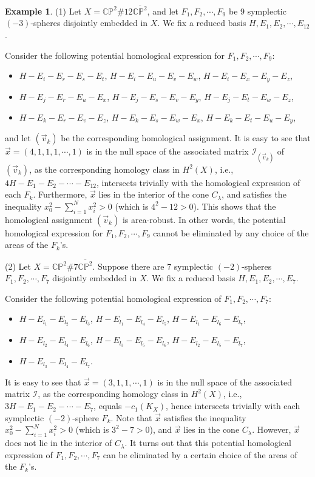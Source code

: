 \documentclass[11pt]{amsart}
\theoremstyle{plain}
\numberwithin{theorem}{section}
\theoremstyle{definition}
\newtheorem{example}[theorem]{Example}
\newcommand{\C}{{\mathbb C}}
\renewcommand{\P}{{\mathbb P}}
\newcommand{\I}{{\mathcal I}}
\begin{document}
\begin{example}
(1) Let $X=\C\P^2\# 12 \overline{\C\P^2}$, and let $F_1,F_2,\cdots,F_9$ be $9$ symplectic 
$(-3)$-spheres disjointly embedded in $X$. We fix a reduced basis $H,E_1,E_2,\cdots,E_{12}$.

Consider the following potential homological expression for $F_1,F_2,\cdots,F_9$:
\begin{itemize}
\item $H-E_{i}-E_{r}-E_{s}-E_t$, $H-E_{i}-E_u-E_v-E_w$, $H-E_{i}-E_x-E_y-E_z$,
\item $H-E_{j}-E_{r}-E_{u}-E_x$, $H-E_{j}-E_s-E_v-E_y$, $H-E_{j}-E_t-E_w-E_z$,
\item $H-E_{k}-E_{r}-E_{v}-E_z$, $H-E_{k}-E_s-E_w-E_x$, $H-E_{k}-E_t-E_u-E_y$,
\end{itemize}
and let $(\vec{v}_k)$ be the corresponding homological assignment. It is easy to see that 
$\vec{x}=(4,1,1,1,\cdots,1)$ is in the null space of the associated matrix $\I_{(\vec{v}_k)}$ of $(\vec{v}_k)$, 
as the corresponding homology class in $H^2(X)$, i.e., $4H-E_1-E_2-\cdots-E_{12}$, intersects trivially with the homological expression of each $F_k$. Furthermore, $\vec{x}$ lies in the interior of the cone $C_\lambda$, and satisfies the inequality $x_0^2-\sum_{i=1}^N x_i^2>0$ (which is $4^2-12>0$). This shows that the homological assignment $(\vec{v}_k)$ is area-robust. In other words, the potential homological expression for $F_1,F_2,\cdots,F_9$ cannot be eliminated by any choice of the areas of the $F_k$'s.

(2) Let $X=\C\P^2\# 7 \overline{\C\P^2}$. Suppose there are $7$ symplectic $(-2)$-spheres 
$F_1,F_2,\cdots,F_7$ disjointly embedded in $X$. We fix a reduced basis $H,E_1,E_2,\cdots,E_{7}$.

Consider the following potential homological expression of $F_1,F_2,\cdots,F_7$:
\begin{itemize}
\item $H-E_{l_1}-E_{l_2}-E_{l_3}$, $H-E_{l_1}-E_{l_4}-E_{l_5}$, $H-E_{l_1}-E_{l_6}-E_{l_7}$, 
\item $H-E_{l_2}-E_{l_4}-E_{l_6}$, $H-E_{l_3}-E_{l_5}-E_{l_6}$, $H-E_{l_2}-E_{l_5}-E_{l_7}$, 
\item $H-E_{l_3}-E_{l_4}-E_{l_7}$.
\end{itemize}
It is easy to see that $\vec{x}=(3,1,1,\cdots,1)$ is in the null space of the associated matrix $\I$,
as the corresponding homology class in $H^2(X)$, i.e., $3H-E_1-E_2-\cdots-E_{7}$, equals 
$-c_1(K_X)$, hence intersects trivially with each symplectic $(-2)$-sphere $F_k$. 
Note that $\vec{x}$ satisfies the inequality 
$x_0^2-\sum_{i=1}^N x_i^2>0$ (which is $3^2-7>0$), and $\vec{x}$ lies in the cone $C_\lambda$. However, 
$\vec{x}$ does not lie in the interior of $C_\lambda$. It turns out that this potential homological expression of $F_1,F_2,\cdots,F_7$ can be eliminated by a certain choice of the areas of the $F_k$'s.

\end{example}
\end{document}
